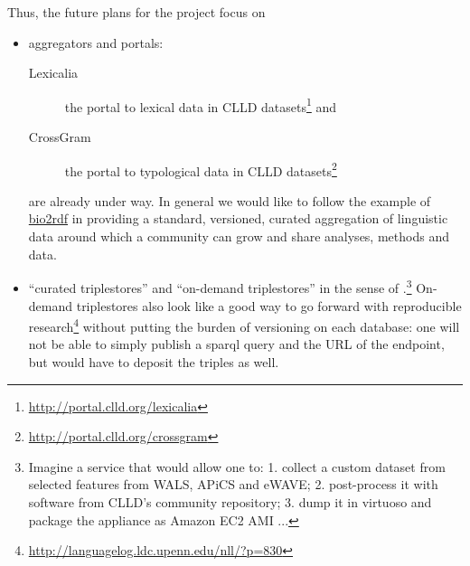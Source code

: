 \documentclass[a4paper,10pt]{article}
\begin{document}
Thus, the future plans for the project focus on
\begin{itemize}
\item aggregators and portals:
  \begin{description}
  \item[Lexicalia] the portal to lexical data in CLLD datasets\footnote{\url{http://portal.clld.org/lexicalia}} and
  \item[CrossGram] the portal to typological data in CLLD datasets\footnote{\url{http://portal.clld.org/crossgram}}
  \end{description}
  are already under way. In general we would like to follow the example of \href{http://bio2rdf.org}{bio2rdf} in providing a standard, versioned, curated aggregation of linguistic data around which a community can grow and share analyses, methods and data.
\item ``curated triplestores'' and ``on-demand triplestores'' in the sense of .\footnote{Imagine a service that would allow one to:
1. collect a custom dataset from selected features from WALS, APiCS and eWAVE;
2. post-process it with software from CLLD's community repository;
3. dump it in virtuoso and package the appliance as Amazon EC2 AMI ...
}
  On-demand triplestores also look like a good way to go forward with reproducible research\footnote{\url{http://languagelog.ldc.upenn.edu/nll/?p=830}}
  without putting the burden of versioning on each database:
  one will not be able to simply publish a sparql query and the URL of the endpoint, but would have to deposit the triples as well.
\end{itemize}



\end{document}
